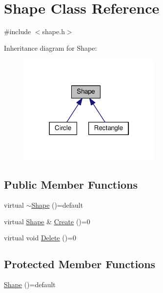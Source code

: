 \hypertarget{class_shape}{\section{Shape Class Reference}
\label{class_shape}
}


{\ttfamily \#include $<$shape.\-h$>$}



Inheritance diagram for Shape\-:
\nopagebreak
\begin{figure}[H]
\begin{center}
\leavevmode
\includegraphics[width=201pt]{class_shape__inherit__graph}
\end{center}
\end{figure}
\subsection*{Public Member Functions}
\begin{DoxyCompactItemize}
\item 
virtual \hyperlink{class_shape_ac8ad2fd02e1e94beeb98e65ab795cd56}{$\sim$\-Shape} ()=default
\item 
virtual \hyperlink{class_shape}{Shape} \& \hyperlink{class_shape_ad2be0ce227fb05dcfec2691a671c82b5}{Create} ()=0
\item 
virtual void \hyperlink{class_shape_a03a2b4615053e0a0edbdc42283e0bb04}{Delete} ()=0
\end{DoxyCompactItemize}
\subsection*{Protected Member Functions}
\begin{DoxyCompactItemize}
\item 
\hyperlink{class_shape_adfc1f3a9555c8e8ef174f84909ec6a47}{Shape} ()=default
\end{DoxyCompactItemize}


